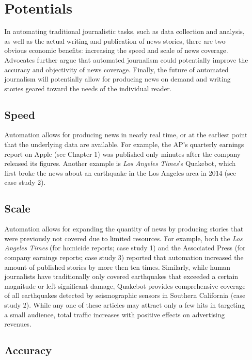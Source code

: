 \documentclass[notoc, symmetric, nobib, nols]{towcenter-book}
\begin{document}
\section{Potentials} 

In automating traditional journalistic tasks, such as data collection and analysis, as well as the actual writing and publication of news stories, there are two obvious economic benefits: increasing the speed and scale of news coverage. Advocates further argue that automated journalism could potentially improve the accuracy and objectivity of news coverage. Finally, the future of automated journalism will potentially allow for producing news on demand and writing stories geared toward the needs of the individual reader.
 
\subsection{Speed}

Automation allows for producing news in nearly real time, or at the earliest point that the underlying data are available. For example, the AP’s quarterly earnings report on Apple (see Chapter 1) was published only minutes after the company released its figures. Another example is \textit{Los Angeles Times}’s Quakebot, which first broke the news about an earthquake in the Los Angeles area in 2014 (see case study 2). 

\subsection{Scale}

Automation allows for expanding the quantity of news by producing stories that were previously not covered due to limited resources. For example, both the \textit{Los Angeles Times} (for homicide reports; case study 1) and the Associated Press (for company earnings reports; case study 3) reported that automation increased the amount of published stories by more then ten times. Similarly, while human journalists have traditionally only covered earthquakes that exceeded a certain magnitude or left significant damage, Quakebot provides comprehensive coverage of all earthquakes detected by seismographic sensors in Southern California (case study 2). While any one of these articles may attract only a few hits in targeting a small audience, total traffic increases with positive effects on advertising revenues.

\subsection{Accuracy}
\end{document}
